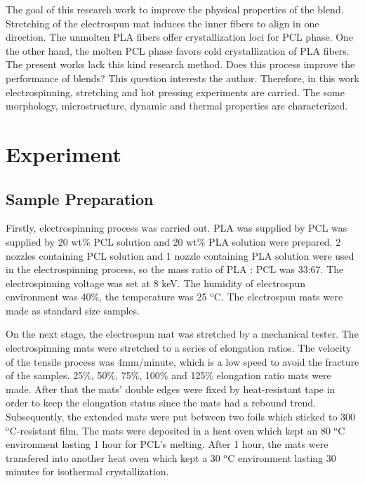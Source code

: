 \documentclass{article}%
\begin{document}
  The goal of this research work to improve the physical properties of the blend. 
  Stretching of the electrospun mat induces the inner fibers to align in one direction. 
  The unmolten PLA fibers offer crystallization loci for PCL phase.
  One the other hand, the molten PCL phase favors cold crystallization of PLA fibers.
  The present works lack this kind research method.
  Does this process improve the performance of blends? This question interests the author.
  Therefore, in this work electrospinning, stretching and hot pressing experiments are carried.
  The some morphology, microstructure, dynamic and thermal properties are characterized.
\label{sec:introduction}
  
\section{Experiment}
  \subsection{Sample Preparation} %
   \label{sub:sample_preparation}
   Firstly, electrospinning process was carried out.
   PLA was supplied by %
   PCL was supplied by %
   20 wt\% PCL solution and 20 wt\% PLA solution were prepared. 
   2 nozzles containing PCL solution and 1 nozzle containing PLA solution were used in the electrospinning process, 
   so the mass ratio of PLA : PCL was  33:67.
   The electrospinning voltage was set at 8 keV.
   The humidity of electrospun environment was 40\%, the temperature was 25 $\mathrm{^o C}$. %
   The electrospun mats were made as standard size samples.


   On the next stage, the electrospun mat was stretched by a mechanical tester. 
   The electrospinning mats were stretched to a series of elongation ratios. 
   The velocity of the tensile process was 4mm/minute, which is a low speed to avoid the fracture of the samples.
   25\%, 50\%, 75\%, 100\% and 125\% elongation ratio mats were made.
   After that the mats' double edges were fixed by heat-resistant tape in order to keep the elongation status since the mats had a rebound trend.
   Subsequently, the extended mats were put between two foils which sticked to 300 $\mathrm{^o C}$-resistant film. 
   The mats were deposited in a heat oven which kept an 80 $\mathrm{^o C}$ environment lasting 1 hour for PCL's melting.
   After 1 hour, the mats were transfered into another heat oven which kept a 30 $\mathrm{^o C}$ environment lasting 30 minutes for isothermal crystallization.
\end{document}
